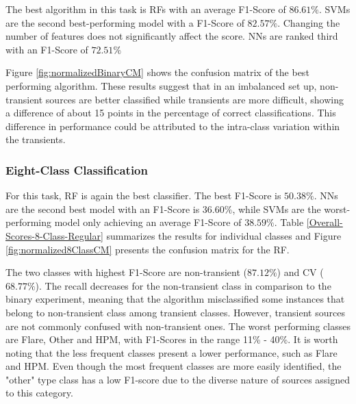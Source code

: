 \documentclass[twocolumn]{aastex62}
\begin{document}
The best algorithm in this task is RFs with an average F1-Score of
$86.61\%$.   
SVMs are the second best-performing model with a F1-Score of $82.57\%$. 
Changing the number of features does not significantly affect the score.
NNs are ranked third with an F1-Score of $72.51\%$

Figure \ref{fig:normalizedBinaryCM} shows the confusion matrix of the best
performing algorithm. These results suggest that in an imbalanced set
up, non-transient sources are better classified while transients are
more difficult, showing a difference of about  15 points in the
percentage of correct classifications.  
This difference in performance could be attributed to the intra-class
variation within the transients.


\subsubsection{Eight-Class Classification}

For this task, RF is again the best classifier.
The best F1-Score is $50.38\%$. 
NNs are the second best model with an F1-Score is $36.60\%$, while
SVMs are the worst-performing model only achieving an average F1-Score
of $38.59\%$.   
Table \ref{Overall-Scores-8-Class-Regular} summarizes the results for 
individual classes and Figure  \ref{fig:normalized8ClassCM} presents 
the confusion matrix for the RF.

The two classes with highest F1-Score are non-transient ($87.12\%$) and
CV ($68.77\%$).  
The recall decreases for the non-transient class in comparison to the binary experiment, 
meaning that the algorithm misclassified some instances that belong to non-transient class
among transient classes. 
However, transient sources are not commonly confused with non-transient ones. 
The worst performing classes are Flare, Other and HPM, with F1-Scores in the 
range 11\% - 40\%. 
It is worth noting that the less frequent classes present a lower performance, 
such as Flare and HPM. 
Even though the most frequent classes are more easily identified, 
the "other" type class has a low F1-score due to the diverse nature 
of sources assigned to this category. 
\end{document}
